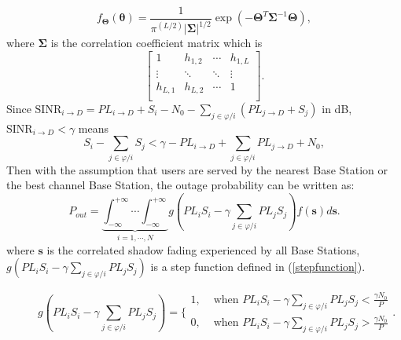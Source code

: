 \begin{equation}
f_{\mathbf{\Theta}}(\boldsymbol{\theta}) = \frac{1}{\pi^(L/2)|\mathbf{\Sigma}|^{1/2}}\exp(-\mathbf{\Theta}^{T}\mathbf{\Sigma}^{-1}\mathbf{\Theta}),
\end{equation}
where $\mathbf{\Sigma}$ is the correlation coefficient matrix which is
\begin{equation}
\left[\begin{array}{cccc}
1 & h_{1,2} & \cdots & h_{1,L}\\
\vdots & \ddots & \ddots & \vdots\\
h_{L,1} & h_{L,2} & \cdots & 1\\
\end{array}\right].
\end{equation}
Since $\text{SINR}_{i\to D}=PL_{i\to D}+S_{i}-N_{0}-\sum_{j\in\varphi/i}(PL_{j\to D} + S_{j})$ in dB, $\text{SINR}_{i\to D}<\gamma$ means
\begin{equation}
S_{i} - \sum_{j\in\varphi/i}S_{j}<\gamma -PL_{i\to D} + \sum_{j\in\varphi/i}PL_{j\to D} + N_{0},
\end{equation}
Then with the assumption that users are served by the nearest Base Station or the best channel Base Station, the outage probability can be written as:
\begin{equation}
\label{outprob}
P_{out} = \underbrace{\int_{-\infty}^{+\infty}\cdots\int_{-\infty}^{+\infty}}_{i =1,\cdots,N} g(PL_{i}S_{i} - \gamma\sum_{j\in\varphi/i}PL_{j}S_{j})f(\mathbf{s})d\mathbf{s}.
\end{equation}
where $\mathbf{s}$ is the correlated shadow fading experienced by all Base Stations, $g(PL_{i}S_{i} - \gamma\sum_{j\in\varphi/i}PL_{j}S_{j})$ is a step function defined in (\ref{stepfunction}).
\begin{figure}[!t]
\normalsize

\begin{equation}
\label{stepfunction}
g(PL_{i}S_{i} - \gamma\sum_{j\in\varphi/i}PL_{j}S_{j}) = \{\begin{array}{cc}
               1, &  \text{  when }PL_{i}S_{i} - \gamma\sum_{j\in\varphi/i}PL_{j}S_{j} <\frac{\gamma N_{0}}{P}\\
               0, & \text{  when }PL_{i}S_{i} - \gamma\sum_{j\in\varphi/i}PL_{j}S_{j} >\frac{\gamma N_{0}}{P}
             \end{array}.
\end{equation}
\hrulefill
\vspace*{4pt}
\end{figure}

